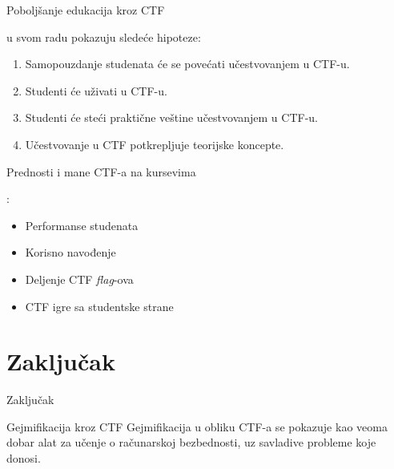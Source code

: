 \documentclass[aspectratio=169,xcolor=dvipsnames]{beamer}
\begin{document}

\begin{frame}{Poboljšanje edukacija kroz CTF}

    \cite{ctfleune} u svom radu pokazuju sledeće hipoteze:
    \begin{enumerate}
        \item Samopouzdanje studenata će se povećati učestvovanjem u CTF-u.
        \item Studenti će uživati u CTF-u.
        \item Studenti će steći praktične veštine učestvovanjem u CTF-u.
        \item Učestvovanje u CTF potkrepljuje teorijske koncepte.
    \end{enumerate}

\end{frame}



\begin{frame}{Prednosti i mane CTF-a na kursevima}

    \cite{ctfuni}:
    \begin{itemize}
        \item Performanse studenata
        \item Korisno navođenje
        \item Deljenje CTF \emph{flag}-ova
        \item CTF igre sa studentske strane
    \end{itemize}

\end{frame}

\section{Zaključak}

\begin{frame}{Zaključak}
    \begin{alertblock}{Gejmifikacija kroz CTF}
        Gejmifikacija u obliku CTF-a se pokazuje kao veoma dobar alat za 
        učenje o računarskoj bezbednosti, uz savladive probleme koje donosi.
    \end{alertblock}
\end{frame}
\end{document}
